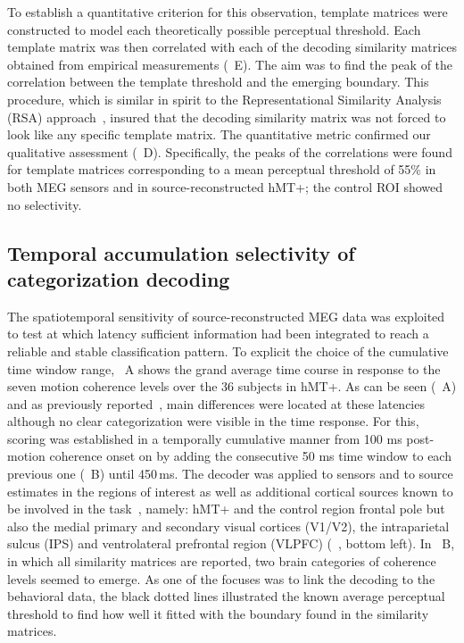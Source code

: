 To establish a quantitative criterion for this observation, template matrices were constructed to model each theoretically possible perceptual threshold. Each template matrix was then correlated with each of the decoding similarity matrices obtained from empirical measurements (~E). The aim was to find the peak of the correlation between the template threshold and the emerging boundary. This procedure, which is similar in spirit to the Representational Similarity Analysis (RSA) approach~\cite{Kriegeskorte-etal:08,9cichy2014resolving}, insured that the decoding similarity matrix was not forced to look like any specific template matrix. The quantitative metric confirmed our qualitative assessment (~D). Specifically, the peaks of the correlations were found for template matrices corresponding to a mean perceptual threshold of 55\% in both MEG sensors and in source-reconstructed hMT+; the control ROI showed no selectivity.

\subsection*{Temporal accumulation selectivity of categorization decoding}
The spatiotemporal sensitivity of source-reconstructed MEG data was exploited to test at which latency sufficient information had been integrated to reach a reliable and stable classification pattern. To explicit the choice of the cumulative time window range, ~A shows the grand average time course in response to the seven motion coherence levels over the 36 subjects in hMT+. As can be seen (~A) and as previously reported~\cite{23zilber2014supramodal}, main differences were located at these latencies although no clear categorization were visible in the time response. For this, scoring was established in a temporally cumulative manner from 100 ms post-motion coherence onset on by adding the consecutive 50 ms time window to each previous one (~B) until 450\,ms. The decoder was applied to sensors and to source estimates in the regions of interest as well as additional cortical sources known to be involved in the task~\cite{23zilber2014supramodal}, namely: hMT+ and the control region frontal pole but also the medial primary and secondary visual cortices (V1/V2), the intraparietal sulcus (IPS) and ventrolateral prefrontal region (VLPFC) (~, bottom left). In ~B, in which all similarity matrices are reported, two brain categories of coherence levels seemed to emerge. As one of the focuses was to link the decoding to the behavioral data, the black dotted lines illustrated the known average perceptual threshold  to find how well it fitted with the boundary found in the similarity matrices.

